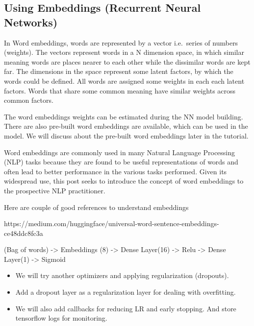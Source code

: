 \documentclass[11pt]{article}
\providecommand{\tightlist}{%
      \setlength{\itemsep}{0pt}\setlength{\parskip}{0pt}}
\begin{document}
    \hypertarget{using-embeddings-recurrent-neural-networks}{%
\subsection{Using Embeddings (Recurrent Neural
Networks)}\label{using-embeddings-recurrent-neural-networks}}

In Word embeddings, words are represented by a vector i.e.~series of
numbers (weights). The vectors represent words in a N dimension space,
in which similar meaning words are places nearer to each other while the
dissimilar words are kept far. The dimensions in the space represent
some latent factors, by which the words could be defined. All words are
assigned some weights in each each latent factors. Words that share some
common meaning have similar weights across common factors.

The word embeddings weights can be estimated during the NN model
building. There are also pre-built word embeddings are available, which
can be used in the model. We will discuss about the pre-built word
embeddings later in the tutorial.

Word embeddings are commonly used in many Natural Language Processing
(NLP) tasks because they are found to be useful representations of words
and often lead to better performance in the various tasks performed.
Given its widespread use, this post seeks to introduce the concept of
word embeddings to the prospective NLP practitioner.

Here are couple of good references to understand embeddings

https://medium.com/huggingface/universal-word-sentence-embeddings-ce48ddc8fc3a

(Bag of words) -\textgreater{} Embeddings (8) -\textgreater{} Dense
Layer(16) -\textgreater{} Relu -\textgreater{} Dense Layer(1)
-\textgreater{} Sigmoid

\begin{itemize}
\tightlist
\item
  We will try another optimizers and applying regularization (dropouts).
\item
  Add a dropout layer as a regularization layer for dealing with
  overfitting.
\item
  We will also add callbacks for reducing LR and early stopping. And
  store tensorflow logs for monitoring.
\end{itemize}
\end{document}
